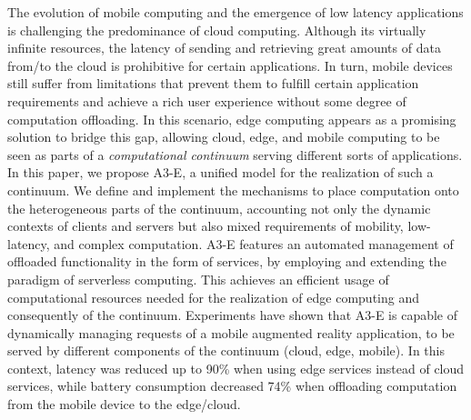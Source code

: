 
The evolution of mobile computing and the emergence of low latency applications is challenging the predominance of cloud computing.
Although its virtually infinite resources, the latency of sending and retrieving great amounts of data from/to the cloud is prohibitive for certain applications. In turn, mobile devices still suffer from limitations that prevent them to fulfill certain application requirements and achieve a rich user experience without some degree of computation offloading.
In this scenario, edge computing appears as a promising solution to bridge this gap, allowing cloud, edge, and mobile computing to be seen as parts of a \textit{computational continuum} serving different sorts of applications. 
In this paper, we propose A3-E, %
a unified model for the realization of such a continuum. We define and implement the mechanisms to place computation onto the heterogeneous parts of the continuum, accounting not only the dynamic contexts of clients and servers but also mixed requirements of mobility, low-latency, and complex computation. A3-E features an automated management of offloaded functionality in the form of services, by employing and extending the paradigm of serverless computing. This achieves an efficient usage of computational resources needed for the realization of edge computing and consequently of the continuum.
Experiments have shown that A3-E is capable of dynamically managing requests of a mobile augmented reality application, to be served by different components of the continuum (cloud, edge, mobile). In this context, latency was reduced up to 90\% when using edge services instead of cloud services, while battery consumption decreased 74\% when offloading computation from the mobile device to the edge/cloud.%


